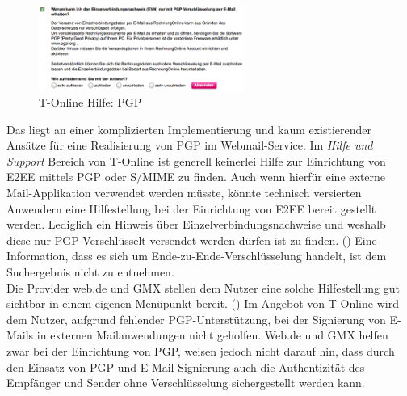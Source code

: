 \documentclass  [paper=a4,
				fontsize=12pt,
				listof=totoc,
				bibliography=totoc
				]{scrreprt}
\begin{document}
			\begin{figure} %
				\vspace{-12pt}
				\centering
				\includegraphics[width=0.6\textwidth]{images/T-Online_Hilfe_PGP}
				\caption[T-Online PGP]{T-Online Hilfe: PGP} 
				\label{fig:T-Online_Hilfe_PGP} %
				\vspace{-12pt}
			\end{figure}
			Das liegt an einer komplizierten Implementierung und kaum existierender Ansätze für eine Realisierung von PGP im Webmail-Service.
			Im \textit{Hilfe und Support} Bereich von T-Online ist generell keinerlei Hilfe zur Einrichtung von \ac{E2EE} mittels \ac{PGP} oder \ac{S/MIME} zu finden.
			Auch wenn hierfür eine externe Mail-Applikation verwendet werden müsste, könnte technisch versierten Anwendern eine Hilfestellung bei der Einrichtung von \ac{E2EE} bereit gestellt werden.
			Lediglich ein Hinweis über Einzelverbindungsnachweise und weshalb diese nur \ac{PGP}-Verschlüsselt versendet werden dürfen ist zu finden. ()
			Eine Information, dass es sich um Ende-zu-Ende-Verschlüsselung handelt, ist dem Suchergebnis nicht zu entnehmen.\\
			Die Provider web.de und GMX stellen dem Nutzer eine solche Hilfestellung gut sichtbar in einem eigenen Menüpunkt bereit. ()
			Im Angebot von T-Online wird dem Nutzer, aufgrund fehlender \ac{PGP}-Unterstützung, bei der Signierung von E-Mails in externen Mailanwendungen nicht geholfen. 
			Web.de und GMX helfen zwar bei der Einrichtung von \ac{PGP}, weisen jedoch nicht darauf hin, dass durch den Einsatz von \ac{PGP} und E-Mail-Signierung auch die Authentizität des Empfänger und Sender ohne Verschlüsselung sichergestellt werden kann. \\
			
\end{document}
